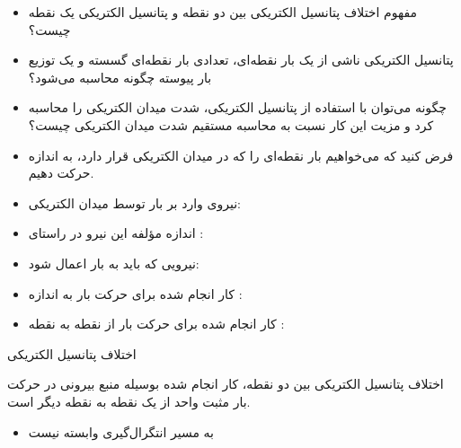 
\begin{ELunit}


\begin{itemize}
\item
  مفهوم اختلاف پتانسیل الکتریکی بین دو نقطه و پتانسیل الکتریکی یک نقطه چیست؟
\item
  پتانسیل الکتریکی ناشی از یک بار نقطه‌ای، تعدادی بار نقطه‌ای گسسته و یک توزیع بار پیوسته چگونه محاسبه می‌شود؟
\item
  چگونه می‌توان با استفاده از پتانسیل الکتریکی، شدت میدان الکتریکی را محاسبه کرد و مزیت این کار نسبت به محاسبه مستقیم شدت میدان الکتریکی چیست؟
\item
  فرض کنید که می‌خواهیم بار نقطه‌ای  را که در میدان الکتریکی  قرار دارد، به اندازه  حرکت دهیم.
\end{itemize}


\begin{itemize}
\item
  نیروی وارد بر بار توسط میدان الکتریکی:
\item
  اندازه مؤلفه این نیرو در راستای :
\item
  نیرویی که باید به بار اعمال شود:
\item
  کار انجام شده برای حرکت بار به اندازه :
\item
  کار انجام شده برای حرکت بار از نقطه  به نقطه :
\end{itemize}


\end{ELunit}

\begin{ELdefinition}{اختلاف پتانسیل الکتریکی}

اختلاف پتانسیل الکتریکی بین دو نقطه، کار انجام شده بوسیله منبع بیرونی در حرکت بار مثبت واحد از یک نقطه به نقطه دیگر است.

\begin{itemize}
\tightlist
\item
  به مسیر انتگرال‌گیری وابسته نیست
\end{itemize}

\end{ELdefinition}

